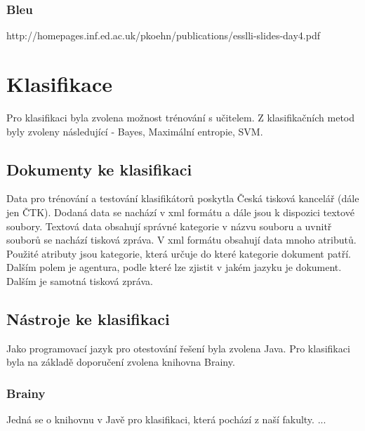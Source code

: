 \documentclass{bakalarka}[12pt]
\begin{document}
\subsubsection{Bleu}
http://homepages.inf.ed.ac.uk/pkoehn/publications/esslli-slides-day4.pdf

\section{Klasifikace} 
Pro klasifikaci byla zvolena možnost trénování s učitelem. Z klasifikačních metod byly zvoleny následující - Bayes, Maximální entropie, SVM.

\subsection{Dokumenty ke klasifikaci}
Data pro trénování a testování klasifikátorů poskytla Česká tisková kancelář (dále jen ČTK). Dodaná data se nachází v xml formátu a dále jsou k dispozici textové soubory. Textová data obsahují správné kategorie v názvu souboru a uvnitř souborů se nachází tisková zpráva. V xml formátu obsahují data mnoho atributů. Použité atributy jsou kategorie, která určuje do které kategorie dokument patří. Dalším polem je agentura, podle které lze zjistit v jakém jazyku je dokument. 
Dalším je samotná tisková zpráva.

\subsection{Nástroje ke klasifikaci}
Jako programovací jazyk pro otestování řešení byla zvolena Java. Pro klasifikaci byla na základě doporučení zvolena knihovna Brainy.
\subsubsection{Brainy}
Jedná se o knihovnu v Javě pro klasifikaci, která pochází z naší fakulty. ...
\end{document}
